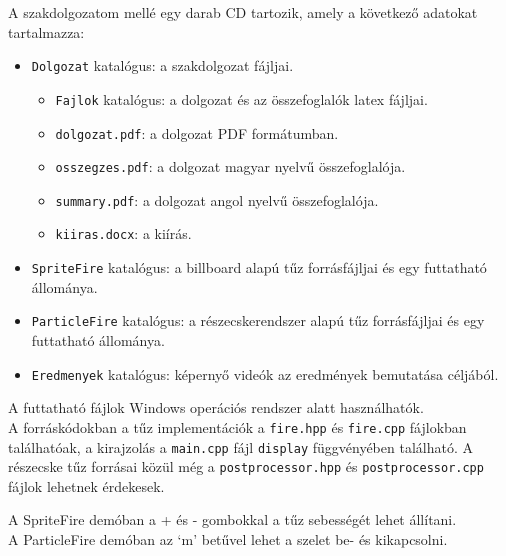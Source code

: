 
A szakdolgozatom mellé egy darab CD tartozik, amely a következő adatokat tartalmazza:
\begin{itemize}

\item \texttt{Dolgozat} katalógus: a szakdolgozat fájljai.
	\begin{itemize}
	\item \texttt{Fajlok} katalógus: a dolgozat és az összefoglalók latex fájljai.
	\item \texttt{dolgozat.pdf}: a dolgozat PDF formátumban.
	\item \texttt{osszegzes.pdf}: a dolgozat magyar nyelvű összefoglalója.
	\item \texttt{summary.pdf}: a dolgozat angol nyelvű összefoglalója.
	\item \texttt{kiiras.docx}: a kiírás.
	\end{itemize}
\item \texttt{SpriteFire} katalógus: a billboard alapú tűz forrásfájljai és egy futtatható állománya.
\item \texttt{ParticleFire} katalógus: a részecskerendszer alapú tűz forrásfájljai és egy futtatható állománya.
\item \texttt{Eredmenyek} katalógus: képernyő videók az eredmények bemutatása céljából.
\end{itemize}

A futtatható fájlok Windows operációs rendszer alatt használhatók.\\
A forráskódokban a tűz implementációk a \texttt{fire.hpp} és \texttt{fire.cpp} fájlokban találhatóak, a kirajzolás a \texttt{main.cpp} fájl \texttt{display} függvényében található. A részecske tűz forrásai közül még a \texttt{postprocessor.hpp} és \texttt{postprocessor.cpp} fájlok lehetnek érdekesek. 

A SpriteFire demóban a + és - gombokkal a tűz sebességét lehet állítani.\\
A ParticleFire demóban az `m' betűvel lehet a szelet be- és kikapcsolni.




